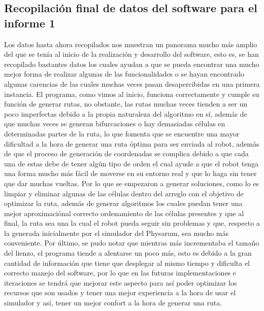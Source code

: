 \subsection{Recopilaci\'on final de datos del software para el informe 1}
    Los datos hasta ahora recopilados nos muestran un panorama
        mucho m\'as amplio del que se ten\'ia al inicio de la realizaci\'on
        y desarrollo del software, esto es, se han recopilado
        bastantes datos los cuales ayudan a que se pueda encontrar
        una mucho mejor forma de realizar algunas de las
        funcionalidades o se hayan encontrado algunas carencias de
        las cuales muchas veces pasan desapercibidas en una
        primera instancia.
        \vskip 0.5cm
    El programa, como vimos al inicio, funciona correctamente
        y cumple su funci\'on de generar rutas, no obstante, las rutas
        muchas veces tienden a ser un poco imperfectas debido a la
        propia naturaleza del algoritmo en s\'i, adem\'as de que muchas
        veces se generan bifurcaciones o hay demasiadas c\'elulas en
        determinadas partes de la ruta, lo que fomenta que se
        encuentre una mayor dificultad a la hora de generar una ruta
        \'optima para ser enviada al robot, adem\'as de que el proceso
        de generaci\'on de coordenadas se complica debido a que cada
        una de estas debe de tener alg\'un tipo de orden el cual ayude
        a que el robot tenga una forma mucho m\'as f\'acil de moverse
        en su entorno real y que lo haga sin tener que dar muchas
        vueltas.
        \vskip 0.5cm
    Por lo que se empezaron a generar soluciones, como lo es
        limpiar y eliminar algunas de las c\'elulas dentro del arreglo
        con el objetivo de optimizar la ruta, adem\'as de generar
        algoritmos los cuales puedan tener una mejor aproximaci\'onal correcto ordenamiento de las c\'elulas presentes y que al
        final, la ruta sea una la cual el robot pueda seguir sin
        problemas y que, respecto a la generada inicialmente por el
        simulador del Physarum, sea mucho m\'as conveniente.
        Por \'ultimo, se pudo notar que mientras m\'as incrementaba el
        tama\~no del lienzo, el programa tiende a alentarse un poco
        m\'as, esto es debido a la gran cantidad de informaci\'on que
        tiene que desplegar al mismo tiempo y dificulta el correcto
        manejo del software, por lo que en las futuras
        implementaciones e iteraciones se tendr\'a que mejorar este
        aspecto para as\'i poder optimizar los recursos que son usados
        y tener una mejor experiencia a la hora de usar el simulador
        y as\'i, tener un mejor confort a la hora de generar una ruta.
        \vskip 0.5cm